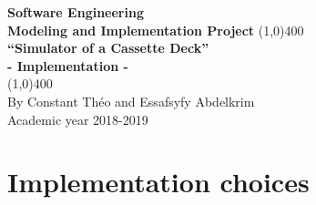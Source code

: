 \documentclass[11pt]{article}
\begin{document}
\begin{titlepage}
\begin{center}
\vspace*{1cm}
\Large{\textbf{Software Engineering}}\\
\Large{\textbf{Modeling and Implementation Project}}
\vfill
\line(1,0){400}\\[1mm]
\huge{\textbf{“Simulator of a Cassette Deck”}}\\[3mm]
\Large{\textbf{- Implementation -}}\\[1mm]
\line(1,0){400}\\
\vfill
By Constant Théo and Essafsyfy Abdelkrim\\
Academic year 2018-2019
\end{center}
\end{titlepage}

\tableofcontents
\thispagestyle{empty}
\clearpage
\setcounter{page}{1}

\section{Implementation choices}
\label{sec:implChoices}
\end{document}
